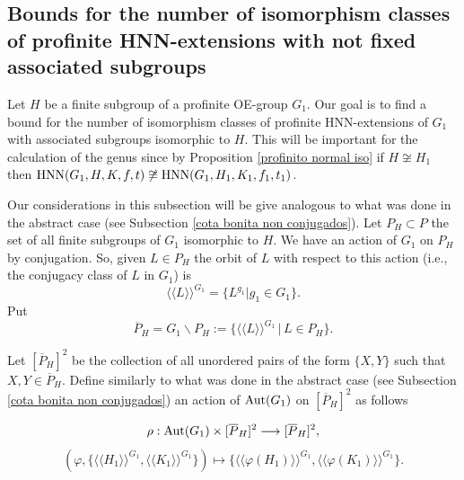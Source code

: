 \documentclass[a4paper,12pt]{article}
\def\OE{{\rm OE}}
\def\aut {{\rm Aut}}
\def\inn {{\rm Inn}}
\def\hnn {{\rm HNN}}
\begin{document}
{\subsection{Bounds for the number of isomorphism classes of profinite HNN-extensions with not fixed associated subgroups } \label{quotasprofnonconjugates}

Let $H$ be a finite subgroup of a profinite OE-group $G_1.$ Our goal is to find a bound for the number of isomorphism classes of profinite HNN-extensions of  $G_1$ with associated subgroups isomorphic to $H$. This will be important for the calculation of the genus since by Proposition \ref{profinito normal iso} if $H\not\cong H_1$ then $\hnn(G_1, H, K, f, t)\not\cong \hnn(G_1, H_1, K_1, f_1, t_1)$. 


Our considerations in this subsection  will be give analogous to what was done in the abstract case (see Subsection \ref{cota bonita non conjugados}). %
Let $P_H \subset P$ the set of all finite subgroups of $G_1$ isomorphic to $H$. We have an action of $G_1$ on $P_H$  by conjugation. So, given $L\in P_H$ the orbit of $L$ with respect to this action (i.e., the conjugacy class of $L$ in $G_1$) is $$\langle\langle L\rangle\rangle^{G_1}= \{L^{g_1}| g_1 \in G_1\}.$$ Put $$\overline{P}_H= G_1\backslash P_H:=\{ \langle\langle L\rangle\rangle^{G_1} \,|\, L \in P_H\}.$$   

Let $[\overline{P}_H]^2$ be the collection of all unordered pairs of the form $\{X, Y\}$ such that $X, Y \in \overline{P}_H.$ Define similarly to what was done in the abstract case (see Subsection \ref{cota bonita non conjugados}) an action of $\aut(G_1)$ on $[\overline{P}_H]^2$ as follows  

\begin{equation*} \rho: \aut(G_1) \times [\overline{P}_H]^2 \longrightarrow [\overline{P}_H]^2, \end{equation*}  %
\begin{equation} \label{acao p}
( \varphi, \{ \langle\langle H_1\rangle\rangle^{G_1} , \langle\langle K_1\rangle\rangle^{G_1} \} ) \mapsto \{ \langle\langle \varphi(H_1)\rangle\rangle^{G_1} , \langle\langle  \varphi(K_1)\rangle\rangle^{G_1}  \}.
\end{equation}

}
\end{document}
